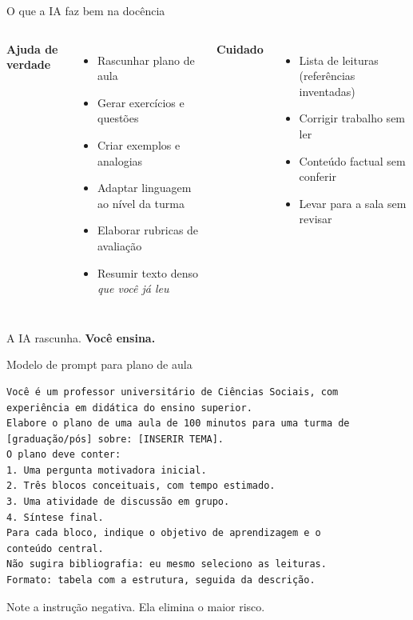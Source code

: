 \documentclass[11pt,aspectratio=169,t]{beamer}
\begin{document}
\begin{frame}{O que a IA faz bem na docência}
  \begin{columns}[t]
    \textbf{\color{verdeCodigo}Ajuda de verdade}
    \begin{itemize}
      \item Rascunhar plano de aula
      \item Gerar exercícios e questões
      \item Criar exemplos e analogias
      \item Adaptar linguagem ao nível da turma
      \item Elaborar rubricas de avaliação
      \item Resumir texto denso \textit{que você já leu}
    \end{itemize}
    \textbf{\color{laranjaDestaque}Cuidado}
    \begin{itemize}
      \item Lista de leituras (\alert{referências inventadas})
      \item Corrigir trabalho sem ler
      \item Conteúdo factual sem conferir
      \item Levar para a sala sem revisar
    \end{itemize}
  \end{columns}
  \pause
  \vfill
  \begin{block}{}
    \centering A IA rascunha. \textbf{Você ensina.}
  \end{block}
\end{frame}

\begin{frame}[fragile]{Modelo de prompt para plano de aula}
\begin{lstlisting}
Você é um professor universitário de Ciências Sociais, com
experiência em didática do ensino superior.
Elabore o plano de uma aula de 100 minutos para uma turma de
[graduação/pós] sobre: [INSERIR TEMA].
O plano deve conter:
1. Uma pergunta motivadora inicial.
2. Três blocos conceituais, com tempo estimado.
3. Uma atividade de discussão em grupo.
4. Síntese final.
Para cada bloco, indique o objetivo de aprendizagem e o
conteúdo central.
Não sugira bibliografia: eu mesmo seleciono as leituras.
Formato: tabela com a estrutura, seguida da descrição.
\end{lstlisting}
\centering\small\alert{Note a instrução negativa. Ela elimina o maior risco.}
\end{frame}
\end{document}
